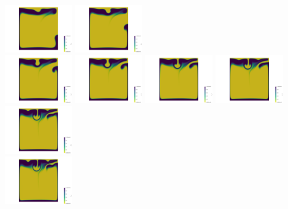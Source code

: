 \begin{itemize}
\begin{center}
\includegraphics[width=3cm]{images/benchmark_vaks97/aspect/lvl7/composition0008}
\includegraphics[width=3cm]{images/benchmark_vaks97/aspect/lvl7/composition0009}\\
\includegraphics[width=3cm]{images/benchmark_vaks97/aspect/lvl7/composition0010}
\includegraphics[width=3cm]{images/benchmark_vaks97/aspect/lvl7/composition0011}
\includegraphics[width=3cm]{images/benchmark_vaks97/aspect/lvl7/composition0012}
\includegraphics[width=3cm]{images/benchmark_vaks97/aspect/lvl7/composition0013}
\includegraphics[width=3cm]{images/benchmark_vaks97/aspect/lvl7/composition0014}\\
\includegraphics[width=3cm]{images/benchmark_vaks97/aspect/lvl7/composition0015}

\end{center}
\end{itemize}
